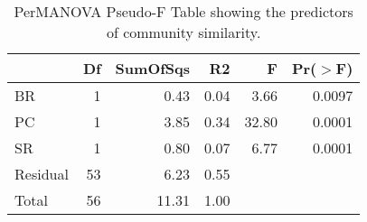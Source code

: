 \begin{table}[ht]
\centering
\begin{tabular}{lrrrrr}
  \hline
 & Df & SumOfSqs & R2 & F & Pr($>$F) \\ 
  \hline
BR & 1 & 0.43 & 0.04 & 3.66 & 0.0097 \\ 
  PC & 1 & 3.85 & 0.34 & 32.80 & 0.0001 \\ 
  SR & 1 & 0.80 & 0.07 & 6.77 & 0.0001 \\ 
  Residual & 53 & 6.23 & 0.55 &  &  \\ 
  Total & 56 & 11.31 & 1.00 &  &  \\ 
   \hline
\end{tabular}
\caption{PerMANOVA Pseudo-F Table showing the predictors of community similarity.} 
\label{tab:com_ng_perm}
\end{table}
